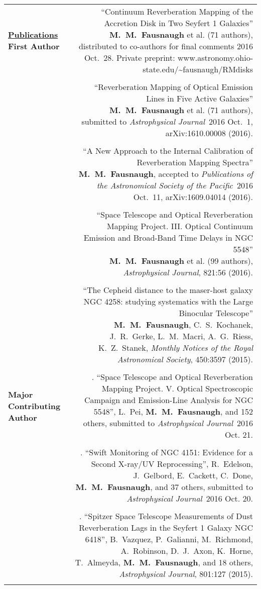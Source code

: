 \documentclass[letterpaper,11pt]{article}
\newcounter{pubs}
\newcommand{\publication}[1]{ {\raggedright\stepcounter{pubs}\thepubs.\,\,#1}}
\newcommand{\apj}{\textit{Astrophysical Journal}}
\newcommand{\pasp}{\textit{Publications of the Astronomical Society of the Pacific}}
\newcommand{\mnras}{\textit{Monthly Notices of the Royal Astronomical Society}}
\begin{document}
\begin{longtable}{LR}
\underline{\textbf{Publications}}   \textbf{First Author} 
&\publication{``Continuum Reverberation Mapping of the Accretion Disk in Two Seyfert 1  Galaxies''\\
\textbf{M.~M.~Fausnaugh} et al. (71 authors), distributed to co-authors for final comments 2016 Oct.~28.  Private preprint:  www.astronomy.ohio-state.edu/\textasciitilde fausnaugh/RMdisks}\\
\\
&\publication{``Reverberation Mapping of Optical Emission Lines in Five Active Galaxies''\\
\textbf{M.~M.~Fausnaugh} et al. (71 authors), submitted to \apj\ 2016 Oct.~1, arXiv:1610.00008 (2016).}\\
\\
&\publication{``A New Approach to the Internal Calibration of Reverberation Mapping Spectra''\\
\textbf{M.~M.~Fausnaugh}, accepted to \pasp\ 2016 Oct.~11, arXiv:1609.04014 (2016).}\\
\\
&\publication{``Space Telescope and Optical Reverberation Mapping Project. III. Optical Continuum Emission and Broad-Band Time Delays in NGC 5548''\\
\textbf{M.~M.~Fausnaugh} et al. (99 authors), \apj, 821:56 (2016).}\\
\\
& \publication{``The Cepheid distance to the maser-host galaxy NGC 4258: studying systematics with the Large Binocular Telescope''\\
\textbf{M.~M.~Fausnaugh}, C.~S.~Kochanek,  J.~R.~Gerke, L.~M.~Macri, A.~G.~Riess, K.~Z.~Stanek, \mnras, 450:3597 (2015).}\\
\\


\textbf{Major Contributing Author}
&\publication{``Space Telescope and Optical Reverberation Mapping Project. V. Optical Spectroscopic Campaign and Emission-Line Analysis for NGC 5548'',
  L.~Pei, \textbf{M.~M.~Fausnaugh}, and 152 others, submitted to \apj\ 2016 Oct. 21.}\\
\\
&\publication{``Swift Monitoring of NGC 4151: Evidence for a Second X-ray/UV Reprocessing'',
R.~Edelson, J.~Gelbord, E.~Cackett, C.~Done, \textbf{M.~M.~Fausnaugh}, and 37 others, submitted to \apj\ 2016 Oct. 20.}\\
\\
&\publication{``Spitzer Space Telescope Measurements of Dust Reverberation Lags in the Seyfert 1 Galaxy NGC 6418'', 
  B.~Vazquez, P.~Galianni, M.~Richmond, A.~Robinson, D.~J.~Axon, K.~Horne, T.~Almeyda, \textbf{M.~M.~Fausnaugh}, and 18 others, \apj, 801:127 (2015).}\\
\\



\end{longtable}
\end{document}
